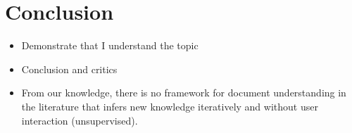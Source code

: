 \section{Conclusion}
\label{sec:sota:conclusion}


\begin{itemize}
	\item Demonstrate that I understand the topic
	\item Conclusion and critics
	\item From our knowledge, there is no framework for document understanding in the literature that infers new knowledge iteratively and without user interaction (unsupervised).

\end{itemize}


